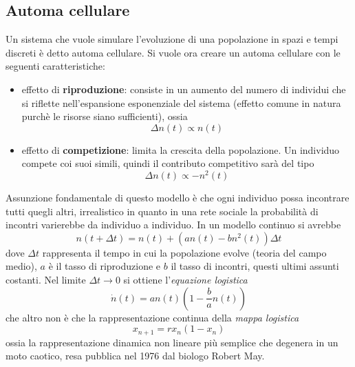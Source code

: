 \documentclass[12pt, a4paper]{book}
\theoremstyle{theorem}
\begin{document}
			\subsection{Automa cellulare}
				Un sistema che vuole simulare l'evoluzione di una popolazione in spazi e tempi discreti è detto automa cellulare.
				Si vuole ora creare un automa cellulare con le seguenti caratteristiche:
				\begin{itemize}
					\item effetto di \textbf{riproduzione}: consiste in un aumento del numero di individui che si riflette nell'espansione esponenziale del sistema (effetto comune in natura purchè le risorse siano sufficienti), ossia
						\begin{equation*}
							\Delta n(t) \propto n(t)
						\end{equation*}
					\item effetto di \textbf{competizione}: limita la crescita della popolazione.
						Un individuo compete coi suoi simili, quindi il contributo competitivo sarà del tipo
						\begin{equation*}
							\Delta n(t) \propto -n^2(t)
						\end{equation*}
				\end{itemize}
				Assunzione fondamentale di questo modello è che ogni individuo possa incontrare tutti quegli altri, irrealistico in quanto in una rete sociale la probabilità di incontri varierebbe da individuo a individuo.
				In un modello continuo si avrebbe
				\begin{equation*}
					n\left(t+\Delta t\right)=n(t)+\left(an(t)-bn^2(t)\right)\Delta t
				\end{equation*}
				dove $\Delta t$ rappresenta il tempo in cui la popolazione evolve (teoria del campo medio), $a$ è il tasso di riproduzione e $b$ il tasso di incontri, questi ultimi assunti costanti.
				Nel limite $\Delta t\to 0$ si ottiene l'\emph{equazione logistica}
				\begin{equation}
					\dot{n}(t)=an(t)\left(1-\frac{b}{a}n(t)\right)
					\label{equation:equazione_logistica}
				\end{equation}
				che altro non è che la rappresentazione continua della \emph{mappa logistica}
				\begin{equation}
					x_{n+1}=rx_{n}\left(1-x_n\right)
					\label{equation:mappa_logistica}
				\end{equation}
				ossia la rappresentazione dinamica non lineare più semplice che degenera in un moto caotico, resa pubblica nel 1976 dal biologo Robert May.\\
\end{document}
